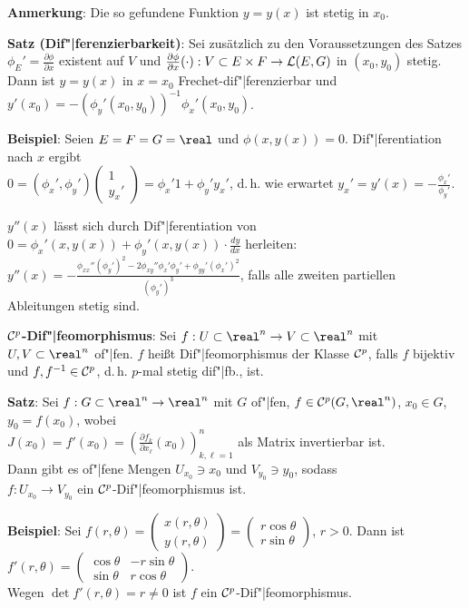 \textbf{Anmerkung}:
Die so gefundene Funktion $y = y(x)$ ist stetig in $x_0$.

\textbf{Satz (Dif"|ferenzierbarkeit)}:
Sei zusätzlich zu den Voraussetzungen des Satzes \\
$\phi_E' = \frac{\partial \phi}{\partial x}$ existent auf $V$ und
$\frac{\partial \phi}{\partial x}(\cdot): V \subset E \times F \rightarrow
\mathcal{L}(E, G)$ in $(x_0, y_0)$ stetig. \\
Dann ist $y = y(x)$ in $x = x_0$ Frechet-dif"|ferenzierbar und
$y'(x_0) = -\left(\phi_y'(x_0, y_0)\right)^{-1} \phi_x'(x_0, y_0)$.

\linie

\textbf{Beispiel}:
Seien $E = F = G = \real$ und $\phi(x, y(x)) = 0$.
Dif"|ferentiation nach $x$ ergibt \\
$0 = (\phi_x', \phi_y')\begin{pmatrix}1 \\ y_x'\end{pmatrix}
= \phi_x'1 + \phi_y' y_x'$, d.\,h. wie erwartet
$y_x' = y'(x) = -\frac{\phi_x'}{\phi_y'}$.

$y''(x)$ lässt sich durch Dif"|ferentiation von
$0 = \phi_x'(x, y(x)) + \phi_y'(x, y(x)) \cdot \frac{dy}{dx}$ herleiten: \\
$y''(x) = -\frac{\phi_{xx}'' (\phi_y')^2 - 2 \phi_{xy}'' \phi_x' \phi_y' +
\phi_{yy}' (\phi_x')^2}{(\phi_y')^3}$, falls
alle zweiten partiellen Ableitungen stetig sind.

\linie
\pagebreak

\textbf{$\mathcal{C}^p$-Dif"|feomorphismus}:
Sei $f: U \subset \real^n \rightarrow V \subset \real^n$ mit
$U, V \subset \real^n$ of"|fen.
$f$ heißt Dif"|feomorphismus der Klasse $\mathcal{C}^p$, falls
$f$ bijektiv und $f, f^{-1} \in \mathcal{C}^p$, d.\,h. $p$-mal stetig dif"|fb., ist.

\textbf{Satz}:
Sei $f: G \subset \real^n \rightarrow \real^n$ mit $G$ of"|fen,
$f \in \C^p(G, \real^n)$, $x_0 \in G$, $y_0 = f(x_0)$, wobei \\
$J(x_0) = f'(x_0) = \left(\frac{\partial f_k}{\partial
x_\ell}(x_0)\right)_{k, \ell = 1}^n$ als Matrix invertierbar ist. \\
Dann gibt es of"|fene Mengen $U_{x_0} \ni x_0$ und $V_{y_0} \ni y_0$, sodass \\
$f: U_{x_0} \rightarrow V_{y_0}$ ein $\mathcal{C}^p$-Dif"|feomorphismus ist.

\linie

\textbf{Beispiel}:
Sei $f(r, \theta) = \begin{pmatrix}x(r, \theta) \\ y(r, \theta)\end{pmatrix} =
\begin{pmatrix}r \cos \theta \\ r \sin \theta\end{pmatrix}$, $r > 0$.
Dann ist $f'(r, \theta) = \begin{pmatrix}\cos \theta & -r \sin \theta \\
\sin \theta & r \cos \theta\end{pmatrix}$. \\
Wegen $\det f'(r, \theta) = r \not= 0$ ist $f$ ein $\mathcal{C}^p$-Dif"|feomorphismus.

